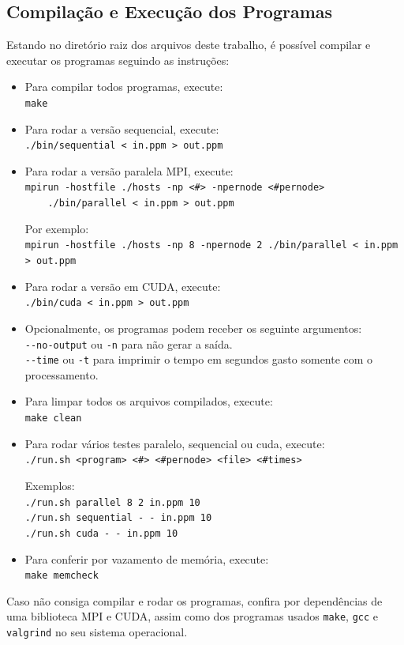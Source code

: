 \subsection{Compilação e Execução dos Programas}

Estando no diretório raiz dos arquivos deste trabalho, é possível compilar e executar os programas seguindo as instruções:

\begin{itemize}
	\item Para compilar todos programas, execute: \\
		\verb|make|

	\item Para rodar a versão sequencial, execute: \\
		\verb|./bin/sequential < in.ppm > out.ppm|

	\item Para rodar a versão paralela MPI, execute: \\
		\verb|mpirun -hostfile ./hosts -np <#> -npernode <#pernode>| \\
		\verb|    ./bin/parallel < in.ppm > out.ppm|

		Por exemplo: \\
		\verb|mpirun -hostfile ./hosts -np 8 -npernode 2 ./bin/parallel < in.ppm > out.ppm|

	\item Para rodar a versão em CUDA, execute: \\
		\verb|./bin/cuda < in.ppm > out.ppm|

	\item Opcionalmente, os programas podem receber os seguinte argumentos:\\
		\verb|--no-output| ou \verb|-n| para não gerar a saída.\\
		\verb|--time| ou \verb|-t| para imprimir o tempo em segundos gasto somente com o processamento.

	\item Para limpar todos os arquivos compilados, execute: \\
		\verb|make clean|

	\item Para rodar vários testes paralelo, sequencial ou cuda, execute: \\
		\verb|./run.sh <program> <#> <#pernode> <file> <#times>|

		Exemplos: \\
		\verb|./run.sh parallel 8 2 in.ppm 10| \\
		\verb|./run.sh sequential - - in.ppm 10|\\
		\verb|./run.sh cuda - - in.ppm 10|

	\item Para conferir por vazamento de memória, execute: \\
		\verb|make memcheck|

\end{itemize}

Caso não consiga compilar e rodar os programas, confira por dependências
de uma biblioteca MPI e CUDA, assim como dos programas usados \texttt{make}, \texttt{gcc} e \texttt{valgrind}
no seu sistema operacional.

